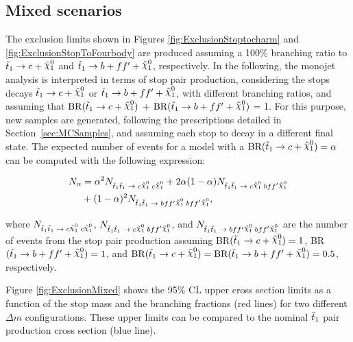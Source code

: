 \subsection{Mixed scenarios}

The exclusion limits shown in Figures \ref{fig:ExclusionStoptocharm} and \ref{fig:ExclusionStopToFourbody} are produced assuming a 100\% branching ratio to $\stoptocharm$ and $\stopfourbody$, respectively.
In the following, the monojet analysis is interpreted in terms of stop pair production, considering the stops decays $\stoptocharm$ or $\stopfourbody$, with different branching ratios, and assuming that $\text{BR}(\stoptocharm)$ + $\text{BR}(\stopfourbody)$ = 1.
For this purpose, new samples are generated, following the prescriptions detailed in Section~\ref{sec:MCSamples}, and assuming each stop to decay in a different final state.
The expected number of events for a model with a $\text{BR}(\stoptocharm) = \alpha$ can be computed with the following expression:

\begin{equation}
\begin{split}
N_{\alpha} &= \alpha^2 N_{\stopone\stopone \;\rightarrow \;c\ninoone \; c\ninoone} + 2\alpha(1-\alpha)N_{\stopone\stopone \;\rightarrow \;c\ninoone \; bff'\ninoone} \\
&+ (1-\alpha)^2 N_{\stopone\stopone \;\rightarrow \;bff'\ninoone \;bff'\ninoone},
\end{split}
\label{eq:MixedSamplesCombination}
\end{equation}

\noindent where $N_{\stopone\stopone \;\rightarrow \;c\ninoone \; c\ninoone}$, $N_{\stopone\stopone \;\rightarrow \;c\ninoone \; bff'\ninoone}$, and $N_{\stopone\stopone \;\rightarrow \;bff'\ninoone \;bff'\ninoone}$ are the number of events from the stop pair production assuming BR$(\stoptocharm)=1$, BR$(\stopfourbody)=1$, and $\text{BR}(\stoptocharm) = \text{BR}(\stopfourbody) = 0.5$, respectively.

Figure \ref{fig:ExclusionMixed} shows the 95\% CL upper cross section limits as a function of the stop mass and the branching fractions (red lines) for two different $\Delta m$ configurations.
These upper limits can be compared to the nominal $\tilde{t}_1$ pair production cross section (blue line).

